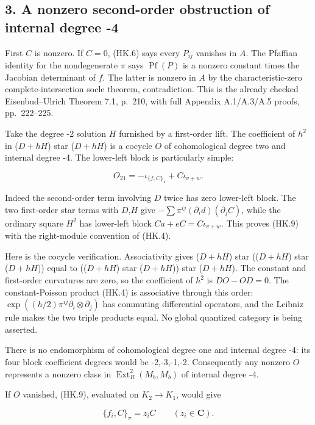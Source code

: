\subsection{3. A nonzero second-order obstruction of internal degree -4}\label{SF-E846:s3}

First \(C\) is nonzero. If \(C=0\), (HK.6) says every \(P_{ij}\) vanishes in \(A\). The
Pfaffian identity for the nondegenerate \(\pi\) says \(\operatorname{Pf}(P)\) is a nonzero
constant times the Jacobian determinant of \(f\). The latter is nonzero
in \(A\) by the characteristic-zero complete-intersection socle theorem,
contradiction. This is the already checked Eisenbud--Ulrich Theorem 7.1,
p.~210, with full Appendix A.1/A.3/A.5 proofs, pp.~222--225.\cite{SFEisenbudUlrich2019}

Take the degree -2 solution \(H\) furnished by a first-order lift.
The coefficient of \(h^2\) in (\(D+hH\)) star (\(D+hH\)) is a cocycle \(O\) of
cohomological degree two and internal degree -4. The lower-left block
is particularly simple:

\[
 O_{21}=-\iota_{\{f,C\}_\pi}+C\iota_{v+w}.
 \tag{HK.9}
\]

Indeed the second-order term involving \(D\) twice has zero lower-left
block. The two first-order star terms with \(D\),\(H\) give
\(-\sum\pi^{ij}(\partial_i d)(\partial_j C)\), while the ordinary square \(H^2\)
has lower-left block \(Ca+eC=C\iota_{v+w}\). This proves (HK.9) with the
right-module convention of (HK.4).

Here is the cocycle verification. Associativity gives
(\(D+hH\)) star ((\(D+hH\)) star (\(D+hH\))) equal to
((\(D+hH\)) star (\(D+hH\))) star (\(D+hH\)). The constant and first-order
curvatures are zero, so the coefficient of \(h^2\) is \(DO-OD=0\). The
constant-Poisson product (HK.4) is associative through this order:
\(\exp((h/2)\pi^{ij}\partial_i\otimes\partial_j)\) has commuting differential
operators, and the Leibniz rule makes the two triple products equal.
No global quantized category is being asserted.

There is no endomorphism of cohomological degree one and internal
degree -4: its four block coefficient degrees would be -2,-3,-1,-2.
Consequently any nonzero \(O\) represents a nonzero class in
\(\operatorname{Ext}^2_R(M_b,M_b)\) of internal degree -4.

If \(O\) vanished, (HK.9), evaluated on \(K_2\to K_1\), would give

\[
 \{f_i,C\}_\pi=z_i C\qquad (z_i\in\mathbf C).
 \tag{HK.10}
\]

